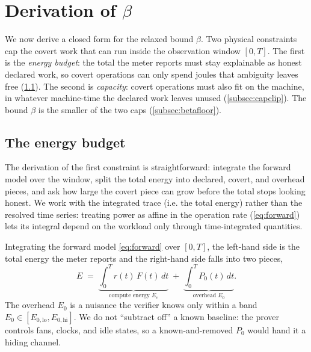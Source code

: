 \documentclass{article}
\theoremstyle{plain}
\theoremstyle{definition}
\theoremstyle{remark}
\begin{document}
\section{Derivation of \texorpdfstring{$\beta$}{beta}}
\label{sec:floor}

We now derive a closed form for the relaxed bound $\beta$. Two physical constraints cap the
covert work that can run inside the observation window $[0,T]$. The first is the
\emph{energy budget}: the total the meter reports must stay explainable as
honest declared work, so covert operations can only spend joules that
ambiguity leaves free (\cref{subsec:derivation}). The second is
\emph{capacity}: covert operations must also fit on the machine, in whatever
machine-time the declared work leaves unused (\cref{subsec:capclip}). The
bound $\beta$ is the smaller of the two caps (\cref{subsec:betafloor}).

\subsection{The energy budget}
\label{subsec:derivation}

The derivation of the first constraint is straightforward: integrate the forward
model over the window, split the total energy into declared, covert, and
overhead pieces, and ask how large the covert piece can grow before the total
stops looking honest. We work with the integrated trace (i.e. the total
energy) rather than the resolved time series: treating power as affine in the
operation rate (\cref{eq:forward}) lets its integral depend on the workload
only through time-integrated quantities.

Integrating the forward model \cref{eq:forward} over $[0,T]$, the left-hand
side is the total energy the meter reports and the right-hand side falls
into two pieces,
\begin{equation}
	E \;=\; \underbrace{\int_0^T r(t)\,F(t)\,dt}_{\text{compute energy } E_c}
	\;+\; \underbrace{\int_0^T P_0(t)\,dt}_{\text{overhead } E_0}.
	\label{eq:integrated}
\end{equation}
The overhead $E_0$ is a nuisance the verifier knows only within a band
$E_0 \in [E_{0,\mathrm{lo}}, E_{0,\mathrm{hi}}]$. We do not ``subtract
off'' a known baseline: the prover controls fans, clocks, and idle states,
so a known-and-removed $P_0$ would hand it a hiding channel.
\end{document}
